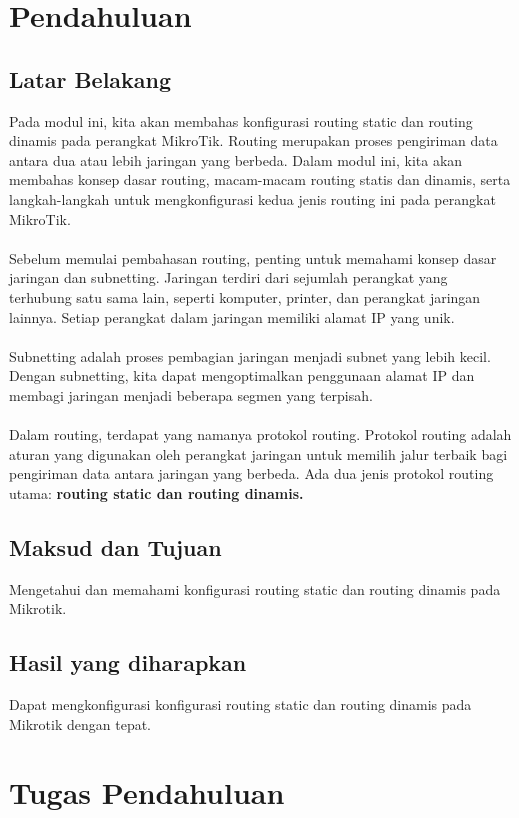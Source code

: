 \section{Pendahuluan}
\subsection{Latar Belakang}
Pada modul ini, kita akan membahas konfigurasi routing static dan routing dinamis pada perangkat
MikroTik. Routing merupakan proses pengiriman data antara dua atau lebih jaringan yang berbeda.
Dalam modul ini, kita akan membahas konsep dasar routing, macam-macam routing statis dan
dinamis, serta langkah-langkah untuk mengkonfigurasi kedua jenis routing ini pada perangkat
MikroTik.\\\\
Sebelum memulai pembahasan routing, penting untuk memahami konsep dasar jaringan dan
subnetting. Jaringan terdiri dari sejumlah perangkat yang terhubung satu sama lain, seperti komputer,
printer, dan perangkat jaringan lainnya. Setiap perangkat dalam jaringan memiliki alamat IP yang
unik.\\\\
Subnetting adalah proses pembagian jaringan menjadi subnet yang lebih kecil. Dengan subnetting, kita
dapat mengoptimalkan penggunaan alamat IP dan membagi jaringan menjadi beberapa segmen yang
terpisah.\\\\
Dalam routing, terdapat yang namanya protokol routing. Protokol routing adalah aturan yang
digunakan oleh perangkat jaringan untuk memilih jalur terbaik bagi pengiriman data antara jaringan
yang berbeda. Ada dua jenis protokol routing utama: \textbf{routing static dan routing dinamis.}

\subsection{Maksud dan Tujuan}
Mengetahui dan memahami konfigurasi routing static dan routing dinamis pada Mikrotik.

\subsection{Hasil yang diharapkan}
Dapat mengkonfigurasi konfigurasi routing static dan routing dinamis pada Mikrotik dengan
tepat.

\section{Tugas Pendahuluan}


